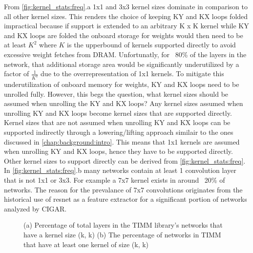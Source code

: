 From \autoref{fig:kernel_stats:freq}.a 1x1 and 3x3 kernel sizes dominate in
comparison to all other kernel sizes. This renders the choice of keeping KY and
KX loops folded impractical because if support is extended to an arbitrary K x K
kernel while KY and KX loops are folded the onboard storage for weights would
then need to be at least $K^2$ where $K$ is the upperbound of kernels supported
directly to avoid excessive weight fetches from DRAM. Unfortunatly, for ~80\% of
the layers in the network, that additional storage area would be significantly
underutilized by a factor of $\frac{1}{K^2}$ due to the overrepresentation of
1x1 kernels. To mitigate this underutilization of onboard memory for weights, KY
and KX loops need to be unrolled fully. However, this begs the question, what
kernel sizes should be assumed when unrolling the KY and KX loops? Any kernel
sizes assumed when unrolling KY and KX loops become kernel sizes that are
supported directly. Kernel sizes that are not assumed when unrolling KY and KX
loops can be supported indirectly through a lowering/lifting approach similair
to the ones discussed in \autoref{chap:background:intro}. This means that 1x1
kernels are assumed when unrolling KY and KX loops, hence they have to be
supported directly. Other kernel sizes to support directly can be derived from
\autoref{fig:kernel_stats:freq}. In \autoref{fig:kernel_stats:freq}.b many
networks contain at least 1 convolution layer that is not 1x1 or 3x3. For
example a 7x7 kernel exists in around ~20\% of networks. The reason for the
prevalance of 7x7 convolutions originates from the historical use of resnet
\cite{resnet} as a feature extractor for a significant portion of networks
analyzed by CIGAR.

\clearpage
\begin{figure}
    \centering
    \caption{(a) Percentage of total layers in the TIMM library's networks that have a kernel size (k, k) (b) The percentage of networks in TIMM that have at least one kernel of size (k, k)}
    \label{fig:kernel_stats:freq}
\end{figure}


